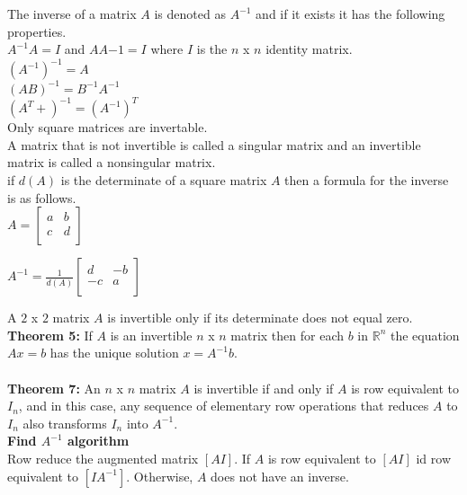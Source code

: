 \documentclass[14pt]{extreport}
\begin{document}
The inverse of a matrix $A$ is denoted as $A^{-1}$ and if it exists it has the following properties.\\

$A^{-1}A = I$ and $AA{-1} = I$ where $I$ is the $n$ x $n$ identity matrix.\\

$(A^{-1})^{-1} = A$\\
$(AB)^{-1} = B^{-1}A^{-1}$\\
$(A^T+)^{-1} = (A^{-1})^T$\\

Only square matrices are invertable.\\

A matrix that is not invertible is called a singular matrix and an invertible matrix is called a nonsingular matrix.\\

if $d(A)$ is the determinate of a square matrix $A$ then a formula for the inverse is as follows.\\

$A = \begin{bmatrix} a & b \\ c & d\\ \end{bmatrix}$



$A^{-1} = \frac{1}{d(A)}\begin{bmatrix} d & -b\\ 
-c & a\\
\end{bmatrix}$

A $2$ x $2$ matrix $A$ is invertible only if its determinate does not equal zero.\\

\textbf{Theorem 5:} If $A$ is an invertible $n$ x $n$ matrix then for each $b$ in $\mathbb{R}^n$ the equation $Ax = b$ has the unique solution $x = A^{-1}b$.\\\\


\textbf{Theorem 7:} An $n$ x $n$ matrix $A$ is invertible if and only if $A$ is row equivalent to $I_n$, and in this case, any sequence of elementary row operations that reduces $A$ to $I_n$ also transforms $I_n$ into $A^{-1}$.\\

\textbf{Find $A^{-1}$ algorithm}\\

Row reduce the augmented matrix $[A I]$. If $A$ is row equivalent to $[A I]$ id row equivalent to $[I A^{-1}]$. Otherwise, $A$ does not have an inverse.\\
\end{document}
